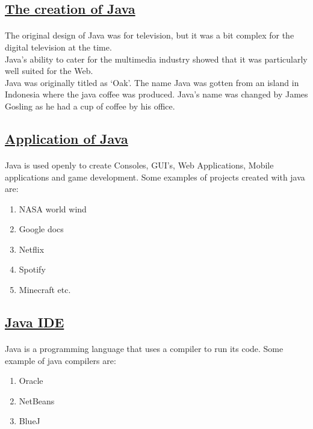 \documentclass[[12pt]{article}
\begin{document}
	\subsection*{\Large \underline{The creation of Java}}
			\paragraph{}			
			The original design of Java was for television, but it was a bit complex for the digital television at the time. \\
			
			Java’s ability to cater for the multimedia industry showed that it was particularly well suited for the Web. \\
			Java was originally titled as ‘Oak’. The name Java was gotten from an island in Indonesia where the java coffee was produced. Java’s name was changed by James Gosling as he had a cup of coffee by his office.
			
	\subsection*{\underline{Application of Java}}
			\paragraph{}
			Java is used openly to create Consoles, GUI’s, Web Applications, Mobile applications and game development. Some examples of projects created with java are:\\
			\begin{enumerate}
				\item 	NASA world wind
				\item 	Google docs
				\item 	Netflix
				\item 	Spotify 
				\item 	Minecraft etc.
			\end{enumerate}
		
			
	\subsection*{\underline{Java IDE}}
			\paragraph{}
			Java is a programming language that uses a compiler to run its code. Some example of java compilers are:\\
			\begin{enumerate}
				\item Oracle
				\item NetBeans
				\item BlueJ
			\end{enumerate}
			
\end{document}
